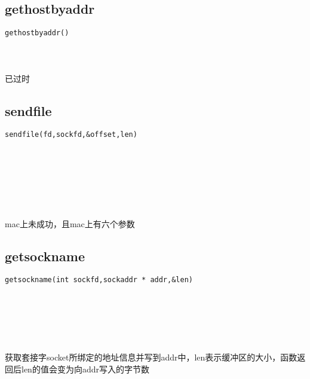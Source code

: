 \documentclass[10pt,a4paper]{article}
\begin{document}
\subsection{gethostbyaddr}
\begin{spacing}{2.0}
\lstset{language=C,numbers=none}
\begin{lstlisting}
gethostbyaddr()
\end{lstlisting}
\paragraph{ \ \ }已过时
\end{spacing}

\subsection{sendfile}
\begin{spacing}{2.0}
\lstset{language=C,numbers=none}
\begin{lstlisting}
sendfile(fd,sockfd,&offset,len)
\end{lstlisting}
{\large\color[rgb]{0.2,0.4,0.6}{fd:}} \\
{\large\color[rgb]{0.2,0.4,0.6}{sockfd:}} \\
{\large\color[rgb]{0.2,0.4,0.6}{\&offset:}} \\
{\large\color[rgb]{0.2,0.4,0.6}{len:}}
\paragraph{ \ \ }mac上未成功，且mac上有六个参数
\end{spacing}

\subsection{getsockname}
\begin{spacing}{2.0}
\lstset{language=C,numbers=none}
\begin{lstlisting}
getsockname(int sockfd,sockaddr * addr,&len)
\end{lstlisting}
{\large\color[rgb]{0.2,0.4,0.6}{sockfd:}} \\
{\large\color[rgb]{0.2,0.4,0.6}{addr:}} \\
{\large\color[rgb]{0.2,0.4,0.6}{\&len:}}
\paragraph{ \ \ }获取套接字socket所绑定的地址信息并写到addr中，len表示缓冲区的大小，函数返回后len的值会变为向addr写入的字节数
\end{spacing}
\end{document}
